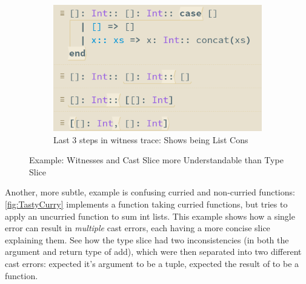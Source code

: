 \begin{figure}[H]
\begin{subfigure}{0.49\textwidth}
\includegraphics[width=1\textwidth]{Media/Figures/concat_error_trace}
\caption{Last 3 steps in witness trace: Shows \code{::} being List Cons}
\end{subfigure}
\caption{Example: Witnesses and Cast Slice more Understandable than Type Slice}
\label{fig:ConcatError}
\end{figure}
Another, more subtle, example is confusing curried and non-curried functions: \cref{fig:TastyCurry} implements a  function taking curried functions, but tries to apply an uncurried  function to sum int lists. This example shows how a single error can result in \textit{multiple} cast errors, each having a more concise slice explaining them. See how the type slice had two inconsistencies (in both the argument and return type of add), which were then separated into two different cast errors:  expected it's argument to be a tuple,  expected the result of  to be a function.

